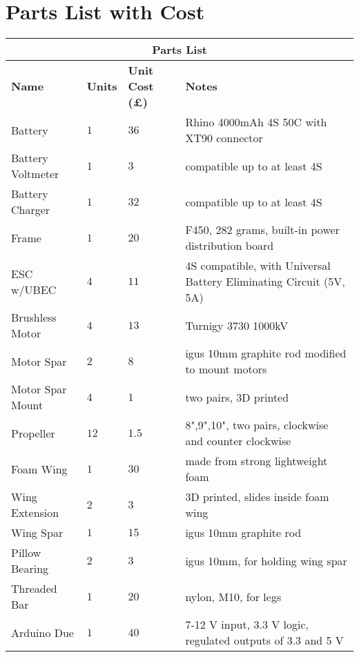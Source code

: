 \chapter{Parts List with Cost}\label{app:parts_list}
\begin{table}[htpb!]
    \centering
    \scriptsize
    \begin{tabular}{p{3.5cm}|p{1.5cm}|p{1.5cm}|p{7.5cm}}
        \hline
        \multicolumn{4}{c}{\normalsize{\textbf{Parts List}}}\\
        \hline
        \textbf{Name} & \textbf{Units} & \textbf{Unit Cost (£)} & \textbf{Notes}\\
        \hline
        Battery & $1$ & $36$ & Rhino 4000mAh 4S 50C with XT90 connector\\
        \hline
        Battery Voltmeter & $1$ & $3$ & compatible up to at least 4S\\
        \hline
        Battery Charger & $1$ & $32$ & compatible up to at least 4S\\
        \hline
        Frame & $1$ & $20$ & F450, 282 grams, built-in power distribution board\\
        \hline
        ESC w/UBEC & $4$ & $11$ & 4S compatible, with Universal Battery Eliminating Circuit (5V, 5A)\\
        \hline
        Brushless Motor & $4$ & $13$ & Turnigy 3730 1000kV\\
        \hline
        Motor Spar & $2$ & $8$ & igus 10mm graphite rod modified to mount motors\\
        \hline
        Motor Spar Mount & $4$ & $1$ & two pairs, 3D printed\\
        \hline
        Propeller & $12$ & $1.5$ & 8",9",10", two pairs, clockwise and counter clockwise\\
        \hline
        Foam Wing & $1$ & $30$ & made from strong lightweight foam\\
        \hline
        Wing Extension & $2$ & $3$ & 3D printed, slides inside foam wing\\
        \hline
        Wing Spar & $1$ & $15$ & igus 10mm graphite rod\\
        \hline
        Pillow Bearing & $2$ & $3$ & igus 10mm, for holding wing spar\\
        \hline
        Threaded Bar & $1$ & $20$ & nylon, M10, for legs\\
        \hline
        Arduino Due & $1$ & $40$ & 7-12 \si{\volt} input, 3.3 \si{\volt} logic, regulated outputs of 3.3 and 5 \si{\volt}\\

\end{tabular}
\end{table}

